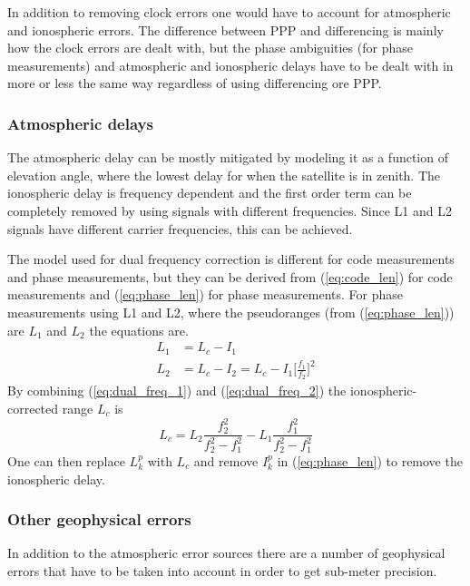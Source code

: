 \documentclass[12pt,a4paper]{article}
\begin{document}
In addition to removing clock errors one would have to account for atmospheric and ionospheric errors.
The difference between PPP and differencing is mainly how the clock errors are dealt with, but the phase ambiguities (for phase measurements) and atmospheric and ionospheric delays have to be dealt with in more or less the same way regardless of using differencing ore PPP.

\subsubsection{Atmospheric delays}
The atmospheric delay can be mostly mitigated by modeling it as a function of elevation angle, where the lowest delay for when the satellite is in zenith.
The ionospheric delay is frequency dependent and the first order term can be completely removed by using signals with different frequencies.
Since L1 and L2 signals have different carrier frequencies, this can be achieved.

The model used for dual frequency correction is different for code measurements and phase measurements, but they can be derived from (\ref{eq:code_len}) for code measurements and (\ref{eq:phase_len}) for phase measurements.
For phase measurements using L1 and L2, where the pseudoranges (from (\ref{eq:phase_len})) are $L_1$ and $L_2$ the equations are.
\begin{subequations}
  \label{eq:dual_freq}
  \begin{align}
    L_1 & = L_c - I_1 \label{eq:dual_freq_1} \\
    L_2 & = L_c - I_2 = L_c - I_1\bigg[\frac{f_1}{f_2}\bigg]^2 \label{eq:dual_freq_2} 
  \end{align}
\end{subequations}
By combining (\ref{eq:dual_freq_1}) and (\ref{eq:dual_freq_2}) the ionospheric-corrected range $L_c$ is
\begin{equation}
  \label{eq:ion_correct}
  L_c=L_2\frac{f_2^2}{f_2^2-f_1^2} - L_1\frac{f_1^2}{f_2^2-f_1^2}
\end{equation}
One can then replace $L_k^p$ with $L_c$ and remove $I_k^p$ in (\ref{eq:phase_len}) to remove the ionospheric delay.

\subsubsection{Other geophysical errors}
In addition to the atmospheric error sources there are a number of geophysical errors that have to be taken into account in order to get sub-meter precision.
\end{document}
